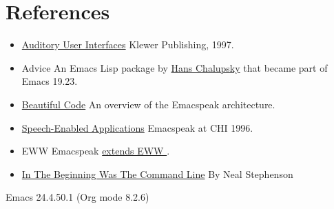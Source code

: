 \documentclass[11pt]{article}
\begin{document}
\section{References}
\label{sec:orgdb597a3}

\begin{itemize}
\item \href{http://emacspeak.sourceforge.net/raman/aui/aui.html}{Auditory User Interfaces}   Klewer Publishing, 1997.
\item Advice      An Emacs Lisp package by    \href{http://www.isi.edu/\~hans/}{Hans Chalupsky} that
became part of Emacs 19.23.
\item \href{http://emacspeak.blogspot.com/2007/07/emacspeak-and-beautiful-code.html}{Beautiful Code}   An overview of the Emacspeak architecture.
\item \href{http://emacspeak.sourceforge.net/raman/publications/chi96-emacspeak/}{Speech-Enabled Applications}   Emacspeak at CHI 1996.
\item EWW   Emacspeak  \href{http://emacspeak.blogspot.com/2014/05/emacspeak-eww-updates-for-complete.html}{extends EWW }.
\item \href{http://artlung.com/smorgasborg/C\_R\_Y\_P\_T\_O\_N\_O\_M\_I\_C\_O\_N.shtml}{In The Beginning Was The Command Line} By Neal Stephenson
\end{itemize}
Emacs 24.4.50.1 (Org mode 8.2.6)
\end{document}

